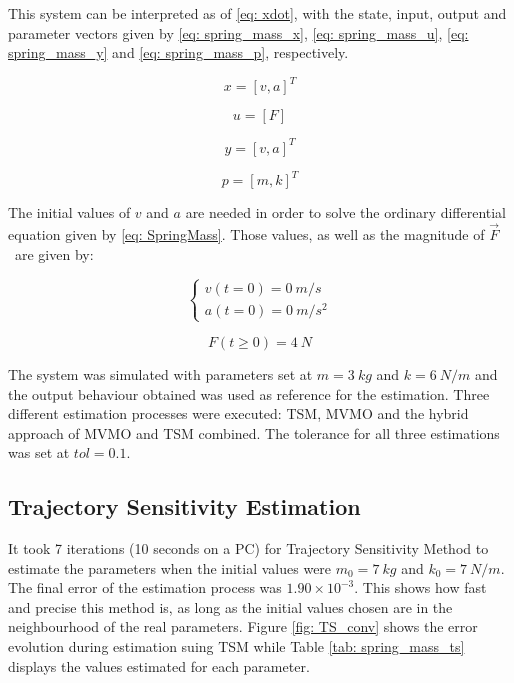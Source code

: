 This system can be interpreted as of \eqref{eq: xdot}, with the state, input, output and parameter vectors given by \eqref{eq: spring_mass_x}, \eqref{eq: spring_mass_u}, \eqref{eq: spring_mass_y} and \eqref{eq: spring_mass_p}, respectively.

\begin{equation}
	x = [v, a]^{T}
	\label{eq: spring_mass_x}
\end{equation}

\begin{equation}
	u = [F]
	\label{eq: spring_mass_u}
\end{equation}

\begin{equation}
	y = [v, a]^{T}
	\label{eq: spring_mass_y}
\end{equation}

\begin{equation}
	p = [m, k]^{T}
	\label{eq: spring_mass_p}
\end{equation}

The initial values of $v$ and $a$ are needed in order to solve the ordinary differential equation given by \eqref{eq: SpringMass}. Those values, as well as the magnitude of $\vec{F}$\ are given by:

\begin{equation}
	\begin{cases}
		v(t=0) = 0\ m/s\\
		a(t=0) = 0\ m/s^{2}
	\end{cases}
\end{equation}

\begin{equation}
	F(t\geq 0) = 4\ N
\end{equation}

The system was simulated with parameters set at $m = 3\ kg$ and $k = 6\ N/m$ and the output behaviour obtained was used as reference for the estimation. Three different estimation processes were executed: TSM, MVMO and the hybrid approach of MVMO and TSM combined. The tolerance for all three estimations was set at $tol = 0.1$.

\subsection{Trajectory Sensitivity Estimation}

It took 7 iterations (10 seconds on a PC) for Trajectory Sensitivity Method to estimate the parameters when the initial values were $m_{0} = 7\ kg$ and $k_{0} = 7\ N/m$. The final error of the estimation process was $1.90\times 10^{-3}$. This shows how fast and precise this method is, as long as the initial values chosen are in the neighbourhood of the real parameters. Figure \ref{fig: TS_conv} shows the error evolution during estimation suing TSM while Table \ref{tab: spring_mass_ts} displays the values estimated for each parameter.

